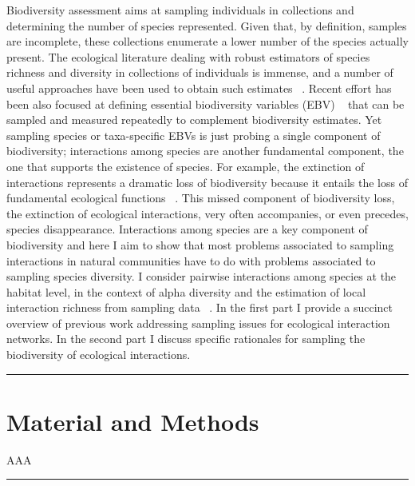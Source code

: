 Biodiversity assessment aims at sampling individuals in collections and determining the number of species represented. Given that, by definition, samples are incomplete, these collections enumerate a lower number of the species actually present. The ecological literature dealing with robust estimators of species richness and diversity in collections of individuals is immense, and a number of useful approaches have been used to obtain such estimates ~\citep{Magurran:1988mm,Gotelli:2001uo,Hortal:2006dc,Colwell:2009gv,Gotelli:2011tb}. Recent effort has been also focused at defining essential biodiversity variables (EBV) ~\citep{Pereira:2013ji} that can be sampled and measured repeatedly to complement biodiversity estimates. Yet sampling species or taxa-specific EBVs is just probing a single component of biodiversity; interactions among species are another fundamental component, the one that supports the existence of species. For example, the extinction of interactions represents a dramatic loss of biodiversity because it entails the loss of fundamental ecological functions ~\citep{ValienteBanuet:2014bw}. This missed component of biodiversity loss, the extinction of ecological interactions, very often accompanies, or even precedes, species disappearance. Interactions among species are a key component of biodiversity and here I aim to show that most problems associated to sampling interactions in natural communities have to do with problems associated to sampling species diversity. I consider pairwise interactions among species at the habitat level, in the context of alpha diversity and the estimation of local interaction richness from sampling data ~\citep{Mao:2005tka}. In the first part I provide a succinct overview of previous work addressing sampling issues for ecological interaction networks. In the second part I discuss specific rationales for sampling the biodiversity of ecological interactions. 

\begin{center}\rule{3in}{0.4pt}\end{center}


\section{Material and Methods}
\label{materialandmethods}

AAA

\begin{center}\rule{3in}{0.4pt}\end{center}


